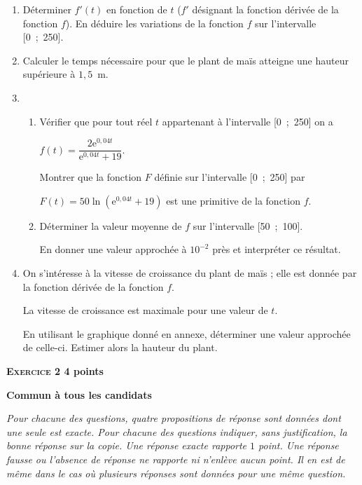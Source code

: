 \documentclass[10pt]{article}
\begin{document}
\begin{enumerate}
\item Déterminer $f'(t)$ en fonction de $t$ ($f'$ désignant la fonction dérivée de la fonction $f$). 
En déduire les variations de la fonction $f$ sur l'intervalle [0~;~250]. 
\item Calculer le temps nécessaire pour que le plant de maïs atteigne une hauteur supérieure à $1,5$~m. 
\item   
	\begin{enumerate}
		\item Vérifier que pour tout réel $t$ appartenant à l'intervalle [0~;~250] on a 
		
$f(t) = \dfrac{2\text{e}^{0,04t}}{\text{e}^{0,04t} + 19}$. 
 
Montrer que la fonction $F$ définie sur l'intervalle [0~;~250] par 

$F(t) = 50\ln \left(\text{e}^{0,04t} + 19\right)$ est une primitive de la fonction $f$. 
		\item Déterminer la valeur moyenne de $f$ sur l'intervalle [50~;~100]. 

En donner une valeur approchée à $10^{-2}$ près et interpréter ce résultat.
	\end{enumerate}  
\item On s'intéresse à la vitesse de croissance du plant de maïs  ; elle est donnée par la fonction dérivée de la fonction $f$.
 
La vitesse de croissance est maximale pour une valeur de $t$. 

En utilisant le graphique donné en annexe, déterminer une valeur approchée de celle-ci. Estimer alors la hauteur du plant.
\end{enumerate}

\vspace{0,5cm}

\textbf{\textsc{Exercice 2} \hfill 4 points}
 
\textbf{Commun  à tous les candidats}

\medskip

\emph{Pour chacune des questions, quatre propositions de réponse sont données dont une seule est exacte. Pour chacune des questions indiquer, sans justification, la bonne réponse sur la copie. Une réponse exacte rapporte $1$ point. Une réponse fausse ou l'absence de réponse ne rapporte ni n'enlève aucun point. Il en est de même dans le cas où plusieurs réponses sont données pour une même question.}

\medskip
 
\end{document}
